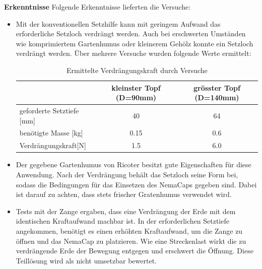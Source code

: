\textbf{Erkenntnisse}
\newline
Folgende Erkenntnisse lieferten die Versuche:
\begin{itemize}
	\item Mit der konventionellen Setzhilfe kann mit geringem Aufwand das erforderliche Setzloch verdrängt werden. Auch bei erschwerten Umständen wie komprimiertem Gartenhumus oder kleinerem Gehölz konnte ein Setzloch verdrängt werden. Über mehrere Versuche wurden folgende Werte ermittelt:
\begin{table}[H]
	\begin{tabular}{|l|c|c|}
		\hline 
		& kleinster Topf (D=90mm) & grösster Topf (D=140mm) \\ 
		\hline 
		geforderte Setztiefe [mm] & 40 & 64 \\ 
		\hline 
		benötigte Masse [kg] & 0.15 & 0.6 \\ 
		\hline 
		Verdrängungskraft[N] & 1.5  & 6.0  \\ 
		\hline 
	\end{tabular} 
	\caption{Ermittelte Verdrängungskraft durch Versuche}
	\label{tab:verdraengungskraft}
\end{table}	
	
	\item Der gegebene Gartenhumus von Ricoter besitzt gute Eigenschaften für diese Anwendung. Nach der Verdrängung behält das Setzloch seine Form bei, sodass die Bedingungen für das Einsetzen des NemaCaps gegeben sind. Dabei ist darauf zu achten, dass stets frischer Gratenhumus verwendet wird.
	
	\item Tests mit der Zange ergaben, dass eine Verdrängung der Erde mit dem identischen Kraftaufwand machbar ist. In der erforderlichen Setztiefe angekommen, benötigt es einen erhöhten Kraftaufwand, um die Zange zu öffnen und das NemaCap zu platzieren. Wie eine Streckenlast wirkt die zu verdrängende Erde der Bewegung entgegen und erschwert die Öffnung. Diese Teillösung wird als nicht umsetzbar bewertet.
\end{itemize} 

